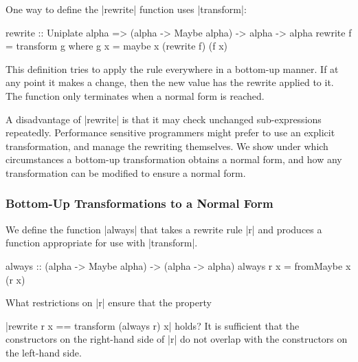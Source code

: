 One way to define the |rewrite| function uses |transform|:

\begin{code}
rewrite :: Uniplate alpha => (alpha -> Maybe alpha) -> alpha -> alpha
rewrite f = transform g
    where g x = maybe x (rewrite f) (f x)
\end{code}

This definition tries to apply the rule everywhere in a bottom-up manner. If at any point it makes a change, then the new value has the rewrite applied to it. The function only terminates when a normal form is reached.

A disadvantage of |rewrite| is that it may check unchanged sub-expressions repeatedly. Performance sensitive programmers might prefer to use an explicit transformation, and manage the rewriting themselves. We show under which circumstances a bottom-up transformation obtains a normal form, and how any transformation can be modified to ensure a normal form.

\subsubsection{Bottom-Up Transformations to a Normal Form}
\label{sec:rewrite_bottom}

We define the function |always| that takes a rewrite rule |r| and produces a function appropriate for use with |transform|.

\begin{code}
always :: (alpha -> Maybe alpha) -> (alpha -> alpha)
always r x = fromMaybe x (r x)
\end{code}

What restrictions on |r| ensure that the property \ignore|rewrite r x == transform (always r) x| holds? It is sufficient that the constructors on the right-hand side of |r| do not overlap with the constructors on the left-hand side.


